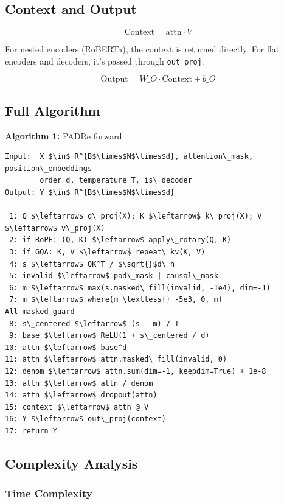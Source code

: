 \subsection{Context and Output}

\[
\text{Context} = \text{attn} \cdot V
\tag{4.11}
\]

For nested encoders (RoBERTa), the context is returned directly. For flat 
encoders and decoders, it's passed through \texttt{out\_proj}:

\[
\text{Output} = W\_O \cdot \text{Context} + b\_O
\tag{4.12}
\]

\subsection{Full Algorithm}

\textbf{Algorithm 1:} PADRe forward
\begin{lstlisting}
Input:  X $\in$ R^{B$\times$N$\times$d}, attention\_mask, position\_embeddings
        order d, temperature T, is\_decoder
Output: Y $\in$ R^{B$\times$N$\times$d}

 1: Q $\leftarrow$ q\_proj(X); K $\leftarrow$ k\_proj(X); V $\leftarrow$ v\_proj(X)
 2: if RoPE: (Q, K) $\leftarrow$ apply\_rotary(Q, K)
 3: if GQA: K, V $\leftarrow$ repeat\_kv(K, V)
 4: s $\leftarrow$ QK^T / $\sqrt{}$d\_h
 5: invalid $\leftarrow$ pad\_mask | causal\_mask
 6: m $\leftarrow$ max(s.masked\_fill(invalid, -1e4), dim=-1)
 7: m $\leftarrow$ where(m \textless{} -5e3, 0, m)                          All-masked guard
 8: s\_centered $\leftarrow$ (s - m) / T
 9: base $\leftarrow$ ReLU(1 + s\_centered / d)
10: attn $\leftarrow$ base^d
11: attn $\leftarrow$ attn.masked\_fill(invalid, 0)
12: denom $\leftarrow$ attn.sum(dim=-1, keepdim=True) + 1e-8
13: attn $\leftarrow$ attn / denom
14: attn $\leftarrow$ dropout(attn)
15: context $\leftarrow$ attn @ V
16: Y $\leftarrow$ out\_proj(context)
17: return Y
\end{lstlisting}

\subsection{Complexity Analysis}

\subsubsection{Time Complexity}

